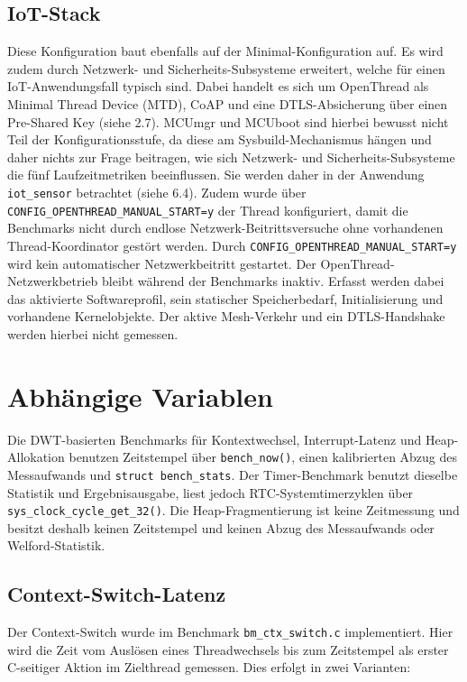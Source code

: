 \subsection{IoT-Stack}
Diese Konfiguration baut ebenfalls auf der Minimal-Konfiguration auf. Es wird zudem durch Netzwerk- und Sicherheits-Subsysteme erweitert, welche für einen IoT-Anwendungsfall typisch sind. Dabei handelt es sich um OpenThread als Minimal Thread Device (MTD), CoAP und eine DTLS-Absicherung über einen Pre-Shared Key (siehe 2.7). MCUmgr und MCUboot sind hierbei bewusst nicht Teil der Konfigurationsstufe, da diese am Sysbuild-Mechanismus hängen und daher nichts zur Frage beitragen, wie sich Netzwerk- und Sicherheits-Subsysteme die fünf Laufzeitmetriken beeinflussen. Sie werden daher in der Anwendung \lstinline[style=fileinline]|iot_sensor| betrachtet (siehe 6.4). Zudem wurde über \lstinline[style=fileinline]|CONFIG_OPENTHREAD_MANUAL_START=y| der Thread konfiguriert, damit die Benchmarks nicht durch endlose Netzwerk-Beitrittsversuche ohne vorhandenen Thread-Koordinator gestört werden. Durch \lstinline[style=fileinline]|CONFIG_OPENTHREAD_MANUAL_START=y| wird kein automatischer Netzwerkbeitritt gestartet. Der OpenThread-Netzwerkbetrieb bleibt während der Benchmarks inaktiv. Erfasst werden dabei das aktivierte Softwareprofil, sein statischer Speicherbedarf, Initialisierung und vorhandene Kernelobjekte. Der aktive Mesh-Verkehr und ein DTLS-Handshake werden hierbei nicht gemessen.

\section{Abhängige Variablen}
Die DWT-basierten Benchmarks für Kontextwechsel, Interrupt-Latenz und Heap-Allokation benutzen Zeitstempel über \lstinline[style=fileinline]|bench_now()|, einen kalibrierten Abzug des Messaufwands und \lstinline[style=fileinline]|struct bench_stats|. Der Timer-Benchmark benutzt dieselbe Statistik und Ergebnisausgabe, liest jedoch RTC-Systemtimerzyklen über \lstinline[style=fileinline]|sys_clock_cycle_get_32()|. Die Heap-Fragmentierung ist keine Zeitmessung und besitzt deshalb keinen Zeitstempel und keinen Abzug des Messaufwands oder Welford-Statistik.

\subsection{Context-Switch-Latenz}
Der Context-Switch wurde im Benchmark \lstinline[style=fileinline]|bm_ctx_switch.c| implementiert. Hier wird die Zeit vom Auslösen eines Threadwechsels bis zum Zeitstempel als erster C-seitiger Aktion im Zielthread gemessen. Dies erfolgt in zwei Varianten:

